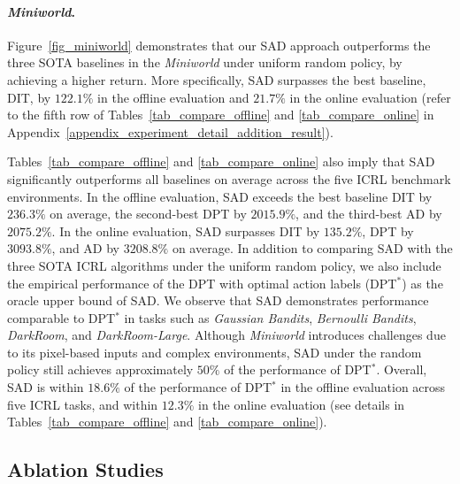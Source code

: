 \paragraph{\textit{Miniworld}.}

%
Figure~\ref{fig_miniworld} demonstrates that our SAD approach outperforms the three SOTA baselines in the \textit{Miniworld} under uniform random policy, by achieving a higher return. 
%
More specifically, SAD surpasses the best baseline, DIT, by $122.1\%$ in the offline evaluation and $21.7\%$ in the online evaluation (refer to the fifth row of Tables~\ref{tab_compare_offline} and \ref{tab_compare_online} in Appendix~\ref{appendix_experiment_detail_addition_result}).



Tables~\ref{tab_compare_offline} and \ref{tab_compare_online} also imply that SAD significantly outperforms all baselines on average across the five ICRL benchmark environments. In the offline evaluation, SAD exceeds the best baseline DIT by $236.3\%$ on average, the second-best DPT by $2015.9\%$, and the third-best AD by $2075.2\%$. In the online evaluation, SAD surpasses DIT by $135.2\%$, DPT by $3093.8\%$, and AD by $3208.8\%$ on average.
%
%
In addition to comparing SAD with the three SOTA ICRL algorithms under the uniform random policy, we also include the empirical performance of the DPT with optimal action labels (DPT$^*$) as the oracle upper bound of SAD. We observe that SAD demonstrates performance comparable to DPT$^*$ in tasks such as \textit{Gaussian Bandits}, \textit{Bernoulli Bandits}, \textit{DarkRoom}, and \textit{DarkRoom-Large}. Although \textit{Miniworld} introduces challenges due to its pixel-based inputs and complex environments, SAD under the random policy still achieves approximately $50\%$ of the performance of DPT$^*$. Overall, SAD is within $18.6\%$ of the performance of DPT$^*$ in the offline evaluation across five ICRL tasks, and within $12.3\%$ in the online evaluation (see details in Tables~\ref{tab_compare_offline} and \ref{tab_compare_online}).









\subsection{Ablation Studies}
\label{subsec_ablation}


